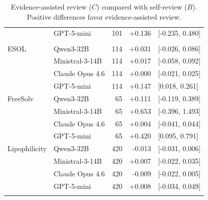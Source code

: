 \begin{table}[t]
\begin{tabular}{llrrl}
      & GPT-5-mini                 & 101 & +0.136 & [-0.235, 0.480] \\
\addlinespace
\midrule
\multicolumn{5}{l}{\textit{Regression: $\mathrm{RMSE}_{B}-\mathrm{RMSE}_{C}$}} \\
\addlinespace
ESOL  & Qwen3-32B                  & 114 & +0.031 & [-0.026, 0.086] \\
      & Ministral-3-14B            & 114 & +0.017 & [-0.058, 0.092] \\
      & Claude Opus 4.6            & 114 & +0.000 & [-0.021, 0.025] \\
      & GPT-5-mini                 & 114 & +0.147 & [0.018, 0.261] \\
\addlinespace
FreeSolv & Qwen3-32B                  & 65 & +0.111 & [-0.119, 0.389] \\
      & Ministral-3-14B            & 65 & +0.653 & [-0.396, 1.493] \\
      & Claude Opus 4.6            & 65 & +0.004 & [-0.041, 0.044] \\
      & GPT-5-mini                 & 65 & +0.420 & [0.095, 0.791] \\
\addlinespace
Lipophilicity & Qwen3-32B                  & 420 & -0.013 & [-0.031, 0.006] \\
      & Ministral-3-14B            & 420 & +0.007 & [-0.022, 0.035] \\
      & Claude Opus 4.6            & 420 & -0.009 & [-0.022, 0.005] \\
      & GPT-5-mini                 & 420 & +0.008 & [-0.034, 0.049] \\
\addlinespace
\bottomrule
\end{tabular}
\caption{Evidence-assisted review ($C$) compared with self-review ($B$). Positive differences favor evidence-assisted review.}
\label{tab:review-comparison}
\end{table}

